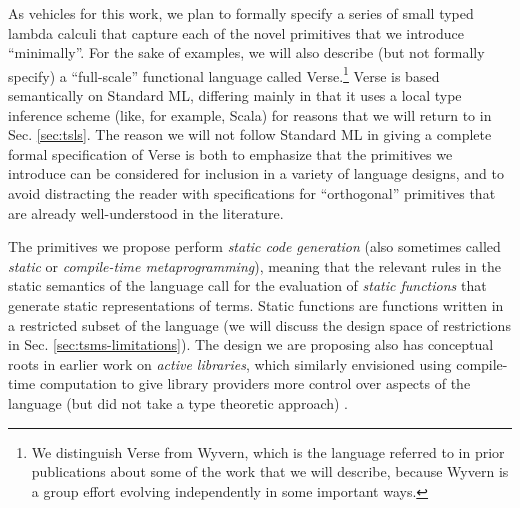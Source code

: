 As vehicles for this work, we plan to formally specify a series of small typed lambda calculi that capture each of the novel primitives that we introduce ``minimally''. For the sake of examples, we will also describe (but not formally specify) a ``full-scale'' functional language called Verse.\footnote{We distinguish Verse from Wyvern, which is the language referred to in prior publications about some of the work that we will describe, because Wyvern is a group effort evolving independently in some important ways.} Verse is based semantically on Standard ML, differing mainly in that it uses a local type inference scheme \cite{Pierce:2000:LTI:345099.345100} (like, for example, Scala) for reasons that we will return to in Sec. \ref{sec:tsls}. The reason we will not follow Standard ML \cite{mthm97-for-dart} in giving a complete formal specification of Verse is both to emphasize that the primitives we introduce can be considered for inclusion in a variety of language designs, and to avoid distracting the reader with specifications for ``orthogonal'' primitives that are already well-understood in the literature. %

The primitives we propose perform \emph{static code generation} (also sometimes called \emph{static} or \emph{compile-time metaprogramming}), meaning that the relevant rules in the static semantics of the language call for the evaluation of \emph{static functions} that generate static representations of terms. Static functions are functions written in a restricted subset of the language (we will discuss the design space of restrictions in Sec. \ref{sec:tsms-limitations}). %
The design we are proposing also has conceptual roots in earlier work on \emph{active libraries}, which similarly envisioned using compile-time computation to give library providers more control over aspects of the language (but did not take a type theoretic approach) \cite{active-libraries-thesis}. %


